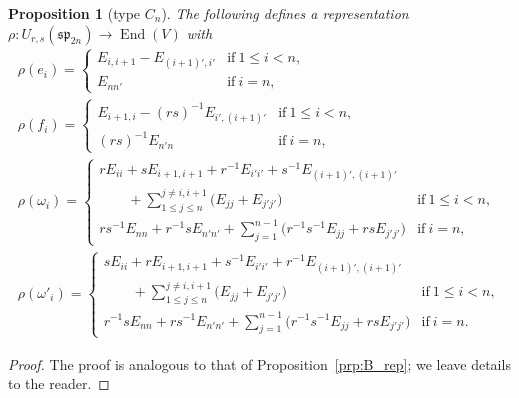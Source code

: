 \documentclass[pdftex]{sigma}
\numberwithin{equation}{section}
\newtheorem{Proposition}[Theorem]{Proposition}
 { \theoremstyle{definition}
\newtheorem{Definition}[Theorem]{Definition}
\newtheorem{Note}[Theorem]{Note}
\newtheorem{Example}[Theorem]{Example}
\newtheorem{Remark}[Theorem]{Remark} }
\DeclareMathOperator{\End}{End}
\newcommand{\ssp}{\mathfrak{sp}}
\begin{document}
\begin{Proposition}[type $C_n$]\label{prp:C_rep}
The following defines a representation $\rho\colon  U_{r,s}(\ssp_{2n})\to \End(V)$ with
\begin{gather*}
 \rho(e_{i}) =
 \begin{cases}
 E_{i,i + 1} - E_{(i + 1)',i'} & \mathrm{if}\ 1\leq i<n ,\\
 E_{nn'} & \mathrm{if}\ i=n,
 \end{cases} \\
 \rho(f_{i}) =
 \begin{cases}
 E_{i+ 1,i} - (rs)^{-1}E_{i',(i + 1)'} & \mathrm{if}\ 1\leq i<n ,\\
 (rs)^{-1}E_{n'n} & \mathrm{if}\ i=n ,
 \end{cases} \\
 \rho(\omega_{i}) =
 \begin{cases}
 \displaystyle rE_{ii} + sE_{i + 1, i+1} + r^{-1}E_{i'i'} + s^{-1}E_{(i +1)',(i+1)'} \\
 \displaystyle\qquad{} + \sum_{1\leq j\leq n}^{j \neq i,i + 1} \bigl(E_{jj} + E_{j'j'}\bigr)
 & \mathrm{if}\ 1\leq i<n ,\\
 \displaystyle{rs^{-1}E_{nn} + r^{-1}sE_{n'n'} + \sum_{j = 1}^{n-1}\bigl(r^{-1}s^{-1}E_{jj} + rsE_{j'j'}\bigr)}
 & \mathrm{if}\ i = n,
 \end{cases} \\
 \rho(\omega'_{i}) =
 \begin{cases}
 \displaystyle sE_{ii} + rE_{i + 1, i+1} + s^{-1}E_{i'i'} + r^{-1}E_{(i +1)',(i+1)'} \\
 \displaystyle \qquad{} + \sum_{1\leq j\leq n}^{j \neq i,i + 1} \bigl(E_{jj} + E_{j'j'}\bigr)
 & \mathrm{if}\ 1\leq i<n, \\
 \displaystyle{r^{-1}sE_{nn} + rs^{-1}E_{n'n'} + \sum_{j = 1}^{n-1}\bigl(r^{-1}s^{-1}E_{jj} + rsE_{j'j'}\bigr)}
 & \mathrm{if}\ i = n.
\end{cases}
\end{gather*}
\end{Proposition}


\begin{proof}
The proof is analogous to that of Proposition~\ref{prp:B_rep}; we leave details to the reader.
\end{proof}
\end{document}
